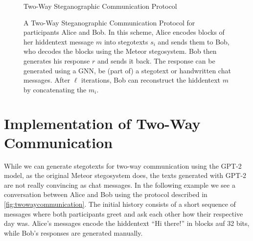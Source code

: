 \begin{figure}[htbp]
  \centering
  \begin{msc}[instance distance=4cm,action width=5cm]{Two-Way Steganographic Communication Protocol}
    \nextlevel[2]
    \nextlevel[3]
    \nextlevel[2]
    \nextlevel[3]
    \nextlevel
    \nextlevel[2]
    \nextlevel[3]
    \nextlevel
    \nextlevel[2]
    \nextlevel[3]
    \nextlevel
  \end{msc}
  \caption{
  A Two-Way Steganographic Communication Protocol for participants Alice and Bob.
  In this scheme, Alice encodes blocks of her hiddentext message $m$ into stegotexts $s_i$ and sends them to Bob, who decodes the blocks using the Meteor stegosystem.
  Bob then generates his response $r$ and sends it back.
  The response can be generated using a GNN, be (part of) a stegotext or handwritten chat messages.
  After $\ell$ iterations, Bob can reconstruct the hiddentext $m$ by concatenating the $m_i$.
  }
  \label{fig:twowaycommunication}
\end{figure}

\section{Implementation of Two-Way Communication}
While we can generate stegotexts for two-way communication using the GPT-2 model, as the original Meteor stegosystem does, the texts generated with GPT-2 are not really convincing as chat messages. 
In the following example we see a conversation between Alice and Bob using the protocol described in \autoref{fig:twowaycommunication}.
The initial history consists of a short sequence of messages where both participants greet and ask each other how their respective day was.
Alice's messages encode the hiddentext ``Hi there!'' in blocks auf 32 bits, while Bob's responses are generated manually.

